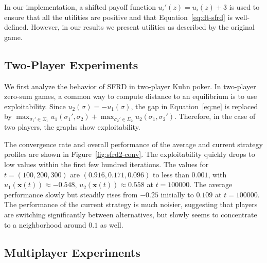 \documentclass{aamas2014}
\newcommand{\bx}{\mathbf{x}}
\begin{document}
In our implementation, a shifted payoff function $u_i'(z) = u_i(z) + 3$ is used to ensure that all the utilities are positive
and that Equation~\ref{eq:dt-sfrd} is well-defined. However, in our results we present utilities as described by the original
game. %



\subsection{Two-Player Experiments}


We first analyze the behavior of SFRD in two-player Kuhn poker. 
In two-player zero-sum games, 
a common way to compute distance to an equilibrium is to use exploitability. Since $u_2(\sigma) = -u_1(\sigma)$, 
the gap in Equation~\ref{eq:ne} is replaced by 
$\max_{\sigma_1' \in \Sigma_1} u_1(\sigma_1', \sigma_2) + \max_{\sigma_2' \in \Sigma_2} u_2(\sigma_1, \sigma_2')$. 
Therefore, in the case of two players, the graphs show exploitability. 


The convergence rate and overall performance of the average and current strategy profiles are shown in
Figure~\ref{fig:sfrd2-conv}. The exploitability quickly drops to low values within the first few hundred iterations. 
The values for $t = (100,200,300)$ are $(0.916, 0.171, 0.096)$ to less than $0.001$, with 
$u_1(\bx(t)) \approx -0.548$, $u_2(\bx(t)) \approx 0.558$ at $t = 100000$. 
The average performance slowly but steadily rises from $-0.25$ initially to $0.109$ at $t = 100000$. The performance of the 
current strategy is much noisier, suggesting that players are switching significantly between alternatives, 
but slowly seems to concentrate to a neighborhood around $0.1$ as well.

\subsection{Multiplayer Experiments}
\end{document}

